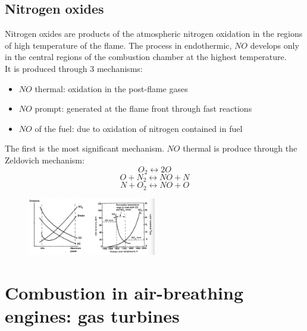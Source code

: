 \documentclass[12pt]{article}
\begin{document}
\subsection{Nitrogen oxides}

Nitrogen oxides are products of the atmospheric nitrogen oxidation in the regions of high temperature of the flame. The process in endothermic, $NO$ develops only in the central regions of the combustion chamber at the highest temperature.\\
It is produced through 3 mechanisms:
\begin{itemize}
    \item $NO$ thermal: oxidation in the post-flame gases
    \item $NO$ prompt: generated at the flame front through fast reactions
    \item $NO$ of the fuel: due to oxidation of nitrogen contained in fuel
\end{itemize}

The first is the most significant mechanism. $NO$ thermal is produce through the Zeldovich mechanism:
\begin{equation}
    O_{2} \leftrightarrow 2O
\end{equation}
\begin{equation}
    O + N_{2} \leftrightarrow NO + N
\end{equation}
\begin{equation}
    N + O_{2} \leftrightarrow NO + O
\end{equation}

\begin{figure}[h!]
\centering
\includegraphics[width=0.5\textwidth]{figures/pollutants.png}
\end{figure}

\newpage

\section{Combustion in air-breathing engines: gas turbines}
\end{document}

